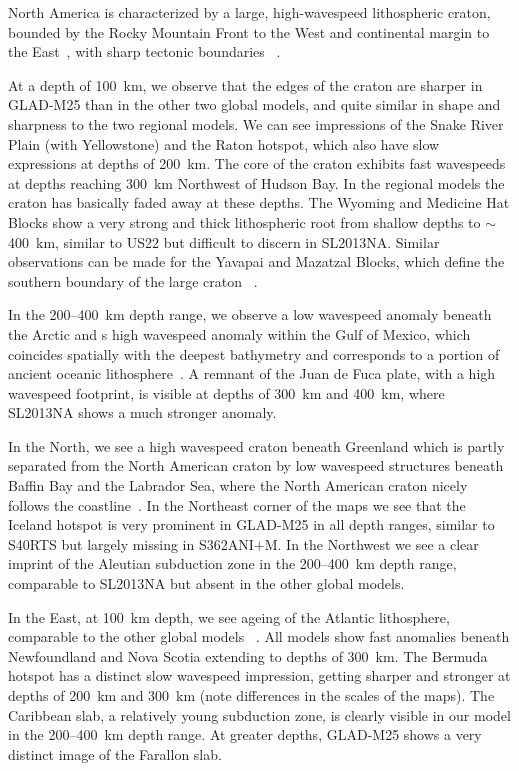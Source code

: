 \documentclass[extra,mreferee]{gji}
\begin{document}
North America is characterized by a large, high-wavespeed lithospheric craton,
bounded by the Rocky Mountain Front to the West and continental
margin to the East~\citep{grand1984upper, whitmeyer2007tectonic},
with sharp tectonic boundaries
~\citep{masters1996shear, grand1997high, megnin2000three, gu2001models}.

At a depth of 100~km, we observe that the edges of the craton are sharper in
GLAD-M25 than in the other two global models,
and quite similar in shape and sharpness to the two regional models.
We can see impressions of the Snake River Plain (with Yellowstone)
and the Raton hotspot, which also have slow expressions at depths of 200~km.
The core of the craton exhibits fast wavespeeds at depths reaching 300~km Northwest of
Hudson Bay.
In the regional models the craton has basically faded away at these depths.
The Wyoming and Medicine Hat Blocks show a very strong and thick lithospheric
root from shallow depths to $\sim$400~km, similar to US22 but
difficult to discern in SL2013NA.
Similar observations can be made for the Yavapai and
Mazatzal Blocks, which define the southern boundary of the large craton
~\citep{schaeffer2014imaging}.

In the 200--400~km depth range, we observe a low wavespeed anomaly beneath the Arctic
and s high wavespeed
anomaly within the Gulf of Mexico, which coincides spatially with the deepest
bathymetry and corresponds to a portion of ancient oceanic
lithosphere~\citep{muller2008, schaeffer2014imaging}.
A remnant of the Juan de Fuca plate,
with a high wavespeed footprint, is visible at depths of 300~km and 400~km,
where SL2013NA shows a much stronger anomaly.

In the North, we see a high wavespeed craton beneath Greenland which is partly
separated from the North American craton by low wavespeed structures beneath
Baffin Bay and the Labrador Sea, where the North American craton nicely follows
the coastline~\citep{chalmers2001development}.
In the Northeast corner of the maps we see that the Iceland hotspot is very
prominent in GLAD-M25 in all depth ranges, similar to S40RTS but largely missing
in S362ANI$+$M. In the Northwest we see a clear imprint of the Aleutian
subduction zone in the 200--400~km depth range, comparable to SL2013NA but absent
in the other global models.

In the East, at 100~km depth,
we see ageing of the Atlantic lithosphere, comparable to the other global models
~\citep{muller2008, schaeffer2014imaging}.
All models show fast anomalies beneath Newfoundland and Nova Scotia extending to
depths of 300~km.
The Bermuda hotspot has a distinct slow wavespeed impression,
getting sharper and stronger at depths of 200~km and 300~km (note differences in
the scales of the maps).
The Caribbean slab, a relatively young subduction zone, is clearly
visible in our model in the 200--400~km depth range.
At greater depths,
GLAD-M25 shows a very distinct image of the Farallon slab.
\end{document}
